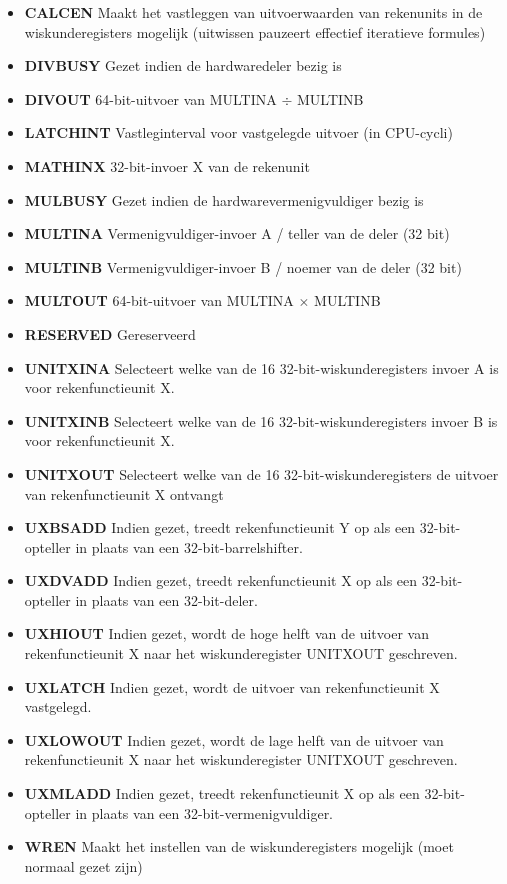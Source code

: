 \begin{itemize}
\item{\bf{CALCEN}} Maakt het vastleggen van uitvoerwaarden van rekenunits in de wiskunderegisters mogelijk (uitwissen pauzeert effectief iteratieve formules)
\item{\bf{DIVBUSY}} Gezet indien de hardwaredeler bezig is
\item{\bf{DIVOUT}} 64-bit-uitvoer van MULTINA $\div$ MULTINB
\item{\bf{LATCHINT}} Vastleginterval voor vastgelegde uitvoer (in CPU-cycli)
\item{\bf{MATHINX}} 32-bit-invoer X van de rekenunit
\item{\bf{MULBUSY}} Gezet indien de hardwarevermenigvuldiger bezig is
\item{\bf{MULTINA}} Vermenigvuldiger-invoer A / teller van de deler (32 bit)
\item{\bf{MULTINB}} Vermenigvuldiger-invoer B / noemer van de deler (32 bit)
\item{\bf{MULTOUT}} 64-bit-uitvoer van MULTINA $\times$ MULTINB
\item{\bf{RESERVED}} Gereserveerd
\item{\bf{UNITXINA}} Selecteert welke van de 16 32-bit-wiskunderegisters invoer A is voor rekenfunctieunit X.
\item{\bf{UNITXINB}} Selecteert welke van de 16 32-bit-wiskunderegisters invoer B is voor rekenfunctieunit X.
\item{\bf{UNITXOUT}} Selecteert welke van de 16 32-bit-wiskunderegisters de uitvoer van rekenfunctieunit X ontvangt
\item{\bf{UXBSADD}} Indien gezet, treedt rekenfunctieunit Y op als een 32-bit-opteller in plaats van een 32-bit-barrelshifter.
\item{\bf{UXDVADD}} Indien gezet, treedt rekenfunctieunit X op als een 32-bit-opteller in plaats van een 32-bit-deler.
\item{\bf{UXHIOUT}} Indien gezet, wordt de hoge helft van de uitvoer van rekenfunctieunit X naar het wiskunderegister UNITXOUT geschreven.
\item{\bf{UXLATCH}} Indien gezet, wordt de uitvoer van rekenfunctieunit X vastgelegd.
\item{\bf{UXLOWOUT}} Indien gezet, wordt de lage helft van de uitvoer van rekenfunctieunit X naar het wiskunderegister UNITXOUT geschreven.
\item{\bf{UXMLADD}} Indien gezet, treedt rekenfunctieunit X op als een 32-bit-opteller in plaats van een 32-bit-vermenigvuldiger.
\item{\bf{WREN}} Maakt het instellen van de wiskunderegisters mogelijk (moet normaal gezet zijn)
\end{itemize}

